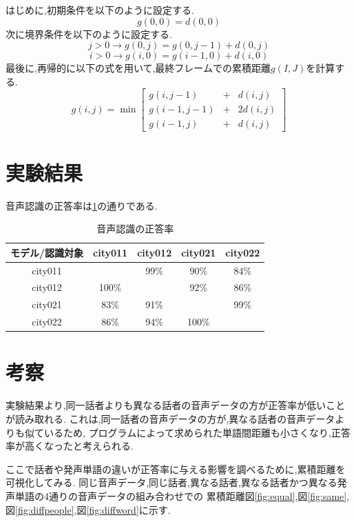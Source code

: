 \documentclass[a4paper,12pt]{article}
\begin{document}
はじめに,初期条件を以下のように設定する.
\[
    g(0,0) = d(0,0)
\]
次に境界条件を以下のように設定する.
\[
    j>0 \rightarrow g(0,j) = g(0,j-1) + d(0,j)
\]
\[
    i>0 \rightarrow g(i,0) = g(i-1,0) + d(i,0)
\]
最後に,再帰的に以下の式を用いて,最終フレームでの累積距離$g(I,J)$を計算する.
\[
g(i, j)=\min \left[\begin{array}{llr}
g(i, j-1) & + & d(i, j) \\
g(i-1, j-1) & + & 2 d(i, j) \\
g(i-1, j) & + & d(i, j)
\end{array}\right]
\]

\section{実験結果}
音声認識の正答率は\ref{tab:correct}の通りである.

\begin{table}[htbp]
    \centering
    \begin{tabular}{|c|c|c|c|c|}
      \hline
      モデル/認識対象 & city011 & city012 & city021 & city022 \\
      \hline
      city011 &       & 99\% & 90\%  & 84\% \\
      \hline
      city012 & 100\% &      & 92\%  & 86\% \\
      \hline
      city021 & 83\%  & 91\% &       & 99\% \\
      \hline
      city022 & 86\% &  94\% & 100\%  &      \\
      \hline
    \end{tabular}
    \caption{音声認識の正答率}
    \label{tab:correct}
\end{table}


\newpage

\section{考察}
実験結果より,同一話者よりも異なる話者の音声データの方が正答率が低いことが読み取れる.
これは,同一話者の音声データの方が,異なる話者の音声データよりも似ているため,
プログラムによって求められた単語間距離も小さくなり,正答率が高くなったと考えられる.

ここで話者や発声単語の違いが正答率に与える影響を調べるために,累積距離を可視化してみる.
同じ音声データ,同じ話者,異なる話者,異なる話者かつ異なる発声単語の4通りの音声データの組み合わせでの
累積距離図\ref{fig:equal},図\ref{fig:same},図\ref{fig:diffpeople},図\ref{fig:diffword}に示す.
\end{document}
